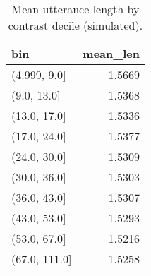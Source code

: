 \begin{table}[!ht]
\centering
\begin{table}
\caption{Mean utterance length by contrast decile (simulated).}
\label{tab:fig04}
\begin{tabular}{lr}
\toprule
bin & mean\_len \\
\midrule
(4.999, 9.0] & 1.5669 \\
(9.0, 13.0] & 1.5368 \\
(13.0, 17.0] & 1.5336 \\
(17.0, 24.0] & 1.5377 \\
(24.0, 30.0] & 1.5309 \\
(30.0, 36.0] & 1.5303 \\
(36.0, 43.0] & 1.5307 \\
(43.0, 53.0] & 1.5293 \\
(53.0, 67.0] & 1.5216 \\
(67.0, 111.0] & 1.5258 \\
\bottomrule
\end{tabular}
\end{table}
\end{table}
